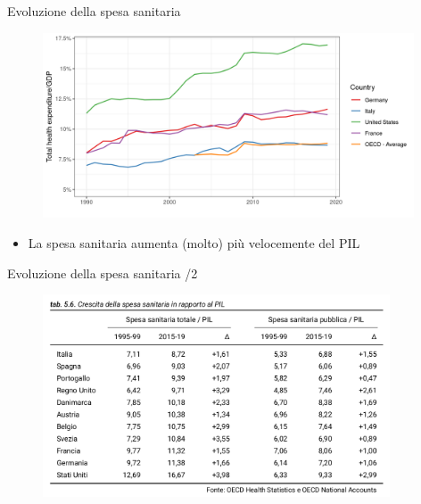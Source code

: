 \documentclass[aspectratio=64,11pt]{beamer}
\begin{document}
\begin{frame}{Evoluzione della spesa sanitaria}
\begin{figure}[htbp]
\centering
\includegraphics[height=5.5cm]{./figure/health-expenditure-growth-OECD.png}
\end{figure}

\begin{itemize}
\item La spesa sanitaria aumenta (molto) più velocemente del PIL
\end{itemize}
\end{frame}

\begin{frame}{Evoluzione della spesa sanitaria /2}
\begin{figure}[htbp]
\centering
\includegraphics[height=6cm]{./figure/crescita-spesa-sanitaria.png}
\end{figure}
\end{frame}
\end{document}
